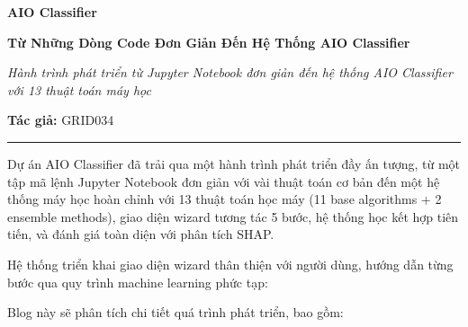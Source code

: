 \documentclass[a4paper,12pt]{article}
\begin{document}
\newpage

\begin{center}
    \vspace*{2em}
    {\LARGE\bfseries AIO Classifier \par}
    \vspace{0.5em}
    {\Huge\bfseries Từ Những Dòng Code Đơn Giản Đến Hệ Thống AIO Classifier \par}
    \vspace{1em}
    {\Large\itshape Hành trình phát triển từ Jupyter Notebook đơn giản đến hệ thống AIO Classifier với 13 thuật toán máy học \par}
    \vspace{2em}
    {\large\textbf{Tác giả:} GRID034} \\
    \vspace{2em}
    \hrule
    \vspace{1.5em}
\end{center}

\vspace{1em}
\noindent
Dự án AIO Classifier đã trải qua một hành trình phát triển đầy ấn tượng, từ một tập mã lệnh Jupyter Notebook đơn giản với vài thuật toán cơ bản đến một hệ thống máy học hoàn chỉnh với 13 thuật toán học máy (11 base algorithms + 2 ensemble methods), giao diện wizard tương tác 5 bước, hệ thống học kết hợp tiên tiến, và đánh giá toàn diện với phân tích SHAP. 

Hệ thống triển khai giao diện wizard thân thiện với người dùng, hướng dẫn từng bước qua quy trình machine learning phức tạp:

\vspace{1em}
\noindent
Blog này sẽ phân tích chi tiết quá trình phát triển, bao gồm:
\end{document}
